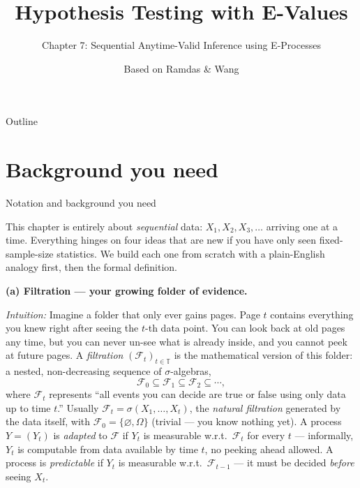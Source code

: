 \documentclass[aspectratio=169,10pt]{beamer}
\title[E-Values -- Ch.7]{Hypothesis Testing with E-Values}
\subtitle{Chapter 7: Sequential Anytime-Valid Inference using E-Processes}
\author{Based on Ramdas \& Wang}
\date{}
\begin{document}
\begin{frame}
\titlepage
\end{frame}

\begin{frame}{Outline}
\tableofcontents
\end{frame}

\section{Background you need}

\begin{frame}[allowframebreaks]{Notation and background you need}

This chapter is entirely about \emph{sequential} data: $X_1, X_2, X_3, \dots$ arriving one at a time.
Everything hinges on four ideas that are new if you have only seen fixed-sample-size statistics.
We build each one from scratch with a plain-English analogy first, then the formal definition.

\vspace{0.3cm}
\textbf{(a) Filtration --- your growing folder of evidence.}

\emph{Intuition:} Imagine a folder that only ever gains pages. Page $t$ contains everything you knew right after
seeing the $t$-th data point. You can look back at old pages any time, but you can never un-see what is already
inside, and you cannot peek at future pages. A \emph{filtration} $(\mathcal{F}_t)_{t \in \mathbb{T}}$ is the mathematical
version of this folder: a nested, non-decreasing sequence of $\sigma$-algebras,
$$\mathcal{F}_0 \subseteq \mathcal{F}_1 \subseteq \mathcal{F}_2 \subseteq \cdots,$$
where $\mathcal{F}_t$ represents ``all events you can decide are true or false using only data up to time $t$.''
Usually $\mathcal{F}_t = \sigma(X_1,\dots,X_t)$, the \emph{natural filtration} generated by the data itself,
with $\mathcal{F}_0 = \{\varnothing,\Omega\}$ (trivial --- you know nothing yet). A process $Y = (Y_t)$ is
\emph{adapted} to $\mathcal F$ if $Y_t$ is measurable w.r.t.\ $\mathcal{F}_t$ for every $t$ --- informally, $Y_t$ is
computable from data available by time $t$, no peeking ahead allowed. A process is \emph{predictable} if $Y_t$ is
measurable w.r.t.\ $\mathcal{F}_{t-1}$ --- it must be decided \emph{before} seeing $X_t$.

\framebreak


\end{frame}
\end{document}
